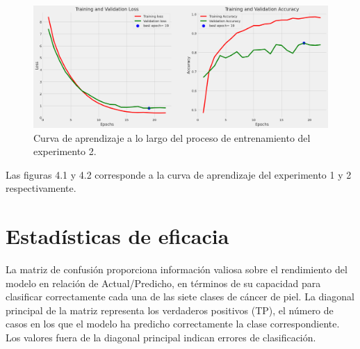 \begin{figure}[ht]%
    \begin{center}
        \includegraphics[width=1\textwidth]{./Graphics/training&validation_p3.png}
        \caption{Curva de aprendizaje a lo largo del proceso de entrenamiento del experimento 2.\label{fig:training_validation_loss_p2}}
    \end{center}
\end{figure}

Las figuras 4.1 y 4.2 corresponde a la curva de aprendizaje del experimento 1 y 2 respectivamente.

\section*{Estadísticas de eficacia}\label{sub:accuracy_statistic_p1}
La matriz de confusión proporciona información valiosa sobre el rendimiento del modelo en relación de Actual/Predicho, en términos de su capacidad para clasificar correctamente cada una de las siete clases de cáncer de piel. La diagonal principal de la matriz representa los verdaderos positivos (TP), el número de casos en los que el modelo ha predicho correctamente la clase correspondiente. Los valores fuera de la diagonal principal indican errores de clasificación.

